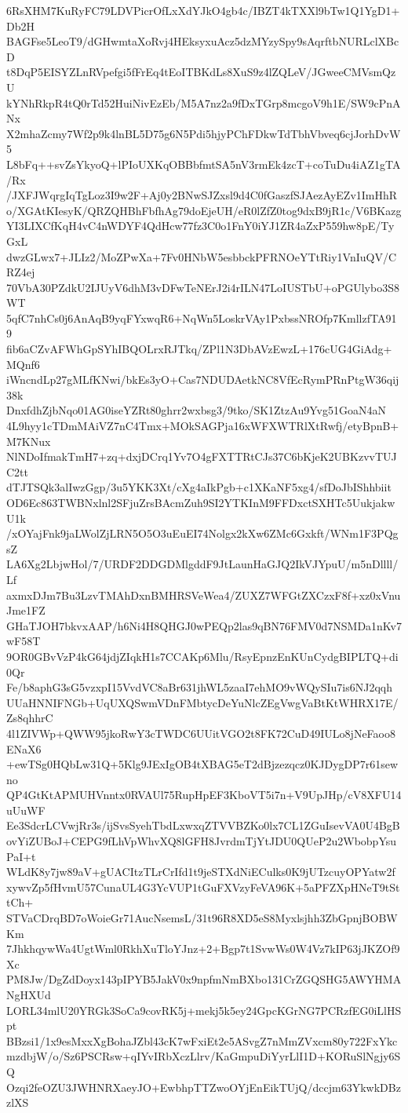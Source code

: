 6RsXHM7KuRyFC79LDVPicrOfLxXdYJkO4gb4c/IBZT4kTXXl9bTw1Q1YgD1+Db2H
BAGFse5LeoT9/dGHwmtaXoRvj4HEksyxuAcz5dzMYzySpy9sAqrftbNURLclXBcD
t8DqP5EISYZLnRVpefgi5fFrEq4tEoITBKdLs8XuS9z4lZQLeV/JGweeCMVsmQzU
kYNhRkpR4tQ0rTd52HuiNivEzEb/M5A7nz2a9fDxTGrp8mcgoV9h1E/SW9cPnANx
X2mhaZcmy7Wf2p9k4lnBL5D75g6N5Pdi5hjyPChFDkwTdTbhVbveq6cjJorhDvW5
L8bFq++svZsYkyoQ+lPIoUXKqOBBbfmtSA5nV3rmEk4zcT+coTuDu4iAZ1gTA/Rx
/JXFJWqrgIqTgLoz3I9w2F+Aj0y2BNwSJZxsl9d4C0fGaszfSJAezAyEZv1ImHhR
o/XGAtKIesyK/QRZQHBhFbfhAg79doEjeUH/eR0lZfZ0tog9dxB9jR1c/V6BKazg
YI3LIXCfKqH4vC4nWDYF4QdHcw77fz3C0o1FnY0iYJ1ZR4aZxP559hw8pE/TyGxL
dwzGLwx7+JLIz2/MoZPwXa+7Fv0HNbW5esbbckPFRNOeYTtRiy1VnIuQV/CRZ4ej
70VbA30PZdkU2IJUyV6dhM3vDFwTeNErJ2i4rILN47LoIUSTbU+oPGUlybo3S8WT
5qfC7nhCs0j6AnAqB9yqFYxwqR6+NqWn5LoskrVAy1PxbssNROfp7KmllzfTA919
fib6aCZvAFWhGpSYhIBQOLrxRJTkq/ZPl1N3DbAVzEwzL+176cUG4GiAdg+MQnf6
iWncndLp27gMLfKNwi/bkEs3yO+Cas7NDUDAetkNC8VfEcRymPRnPtgW36qij38k
DnxfdhZjbNqo01AG0iseYZRt80ghrr2wxbsg3/9tko/SK1ZtzAu9Yvg51GoaN4aN
4L9hyy1cTDmMAiVZ7nC4Tmx+MOkSAGPja16xWFXWTRlXtRwfj/etyBpnB+M7KNux
NlNDoIfmakTmH7+zq+dxjDCrq1Yv7O4gFXTTRtCJs37C6bKjeK2UBKzvvTUJC2tt
dTJTSQk3alIwzGgp/3u5YKK3Xt/cXg4aIkPgb+c1XKaNF5xg4/sfDoJbIShhbiit
OD6Ec863TWBNxlnl2SFjuZrsBAcmZuh9SI2YTKInM9FFDxctSXHTc5UukjakwU1k
/xOYajFnk9jaLWolZjLRN5O5O3uEuEI74Nolgx2kXw6ZMc6Gxkft/WNm1F3PQgsZ
LA6Xg2LbjwHol/7/URDF2DDGDMlgddF9JtLaunHaGJQ2IkVJYpuU/m5nDllll/Lf
axmxDJm7Bu3LzvTMAhDxnBMHRSVeWea4/ZUXZ7WFGtZXCzxF8f+xz0xVnuJme1FZ
GHaTJOH7bkvxAAP/h6Ni4H8QHGJ0wPEQp2las9qBN76FMV0d7NSMDa1nKv7wF58T
9OR0GBvVzP4kG64jdjZIqkH1s7CCAKp6Mlu/RsyEpnzEnKUnCydgBIPLTQ+di0Qr
Fe/b8aphG3sG5vzxpI15VvdVC8aBr631jhWL5zaaI7ehMO9vWQySIu7is6NJ2qqh
UUaHNNIFNGb+UqUXQSwmVDnFMbtycDeYuNlcZEgVwgVaBtKtWHRX17E/Zs8qhhrC
4l1ZIVWp+QWW95jkoRwY3cTWDC6UUitVGO2t8FK72CuD49IULo8jNeFaoo8ENaX6
+ewTSg0HQbLw31Q+5Klg9JExIgOB4tXBAG5eT2dBjzezqcz0KJDygDP7r61sewno
QP4GtKtAPMUHVnntx0RVAUl75RupHpEF3KboVT5i7n+V9UpJHp/cV8XFU14uUuWF
Ee3SdcrLCVwjRr3s/ijSvsSyehTbdLxwxqZTVVBZKo0lx7CL1ZGuIsevVA0U4BgB
ovYiZUBoJ+CEPG9fLhVpWhvXQ8lGFH8JvrdmTjYtJDU0QUeP2u2WbobpYsuPaI+t
WLdK8y7jw89aV+gUACItzTLrCrIfd1t9jeSTXdNiECulks0K9jUTzcuyOPYatw2f
xywvZp5fHvmU57CunaUL4G3YcVUP1tGuFXVzyFeVA96K+5aPFZXpHNeT9tSttCh+
STVaCDrqBD7oWoieGr71AucNsemsL/31t96R8XD5eS8Myxlsjhh3ZbGpnjBOBWKm
7JhkhqywWa4UgtWml0RkhXuTloYJnz+2+Bgp7t1SvwWs0W4Vz7kIP63jJKZOf9Xc
PM8Jw/DgZdDoyx143pIPYB5JakV0x9npfmNmBXbo131CrZGQSHG5AWYHMANgHXUd
LORL34mlU20YRGk3SoCa9covRK5j+mekj5k5ey24GpcKGrNG7PCRzfEG0iLlHSpt
BBzsi1/1x9esMxxXgBohaJZbl43cK7wFxiEt2e5ASvgZ7nMmZVxcm80y722FxYkc
mzdbjW/o/Sz6PSCRsw+qIYvIRbXczLlrv/KaGmpuDiYyrLlI1D+KORuSlNgjy6SQ
Ozqi2feOZU3JWHNRXaeyJO+EwbhpTTZwoOYjEnEikTUjQ/dccjm63YkwkDBzzlXS
